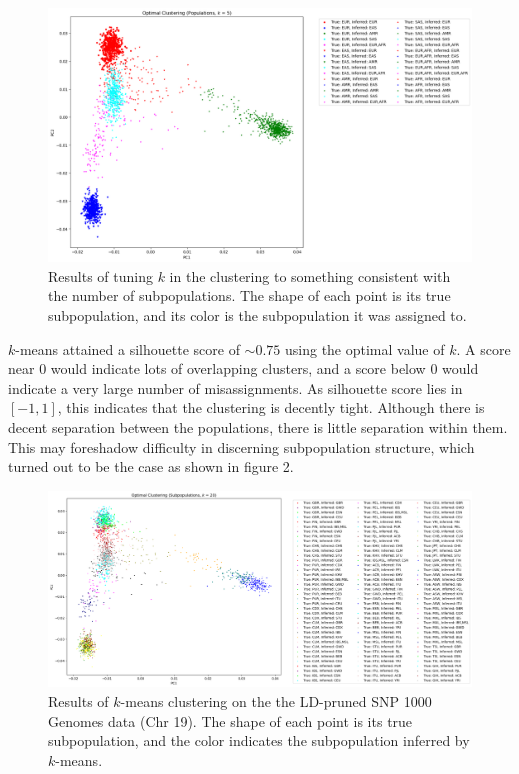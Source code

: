 \documentclass[11pt]{article}
\theoremstyle{definition}
\begin{document}
\begin{figure}
    \begin{center}
        \includegraphics[scale=0.35]{img/snp_clustering_report_34_1.png}
    \end{center}
    \caption{Results of tuning $k$ in the clustering to something consistent with the number of subpopulations. The shape of each point is its true subpopulation, and its color is the subpopulation it was assigned to.}
    \label{fig:kmeanspop}
\end{figure}

\noindent $k$-means attained a silhouette score of $\sim 0.75$ using the optimal value of $k$. A score near 0 would indicate lots of overlapping clusters, and a score below 0 would indicate a very large number of misassignments. As silhouette score lies in $[-1, 1]$, this indicates that the clustering is decently tight. Although there is decent separation between the populations, there is little separation within them. This may foreshadow difficulty in discerning subpopulation structure, which turned out to be the case as shown in figure 2.

\begin{figure}
    \begin{center}
        \includegraphics[trim={0 0 0 7cm},scale=0.35]{img/snp_clustering_report_38_1.png}
    \end{center}
    \caption{Results of $k$-means clustering on the the LD-pruned SNP 1000 Genomes data (Chr 19). The shape of each point is its true subpopulation, and the color indicates the subpopulation inferred by $k$-means.}
    \label{fig:kmeanssubpop}
\end{figure}
\end{document}
